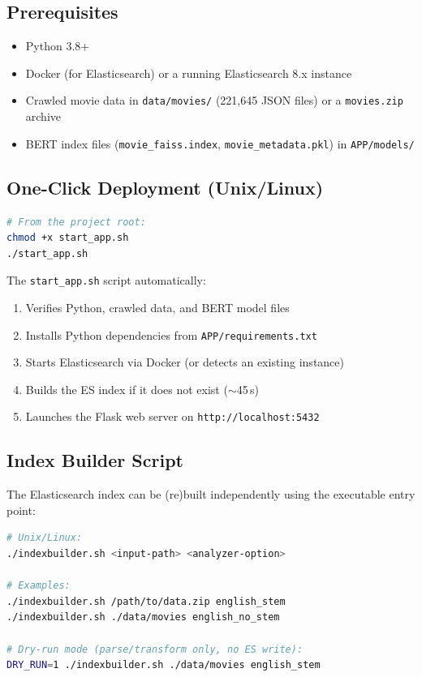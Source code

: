 \documentclass[11pt,a4paper]{article}
\begin{document}
\subsection{Prerequisites}

\begin{itemize}[nosep]
  \item Python 3.8+
  \item Docker (for Elasticsearch) or a running Elasticsearch 8.x instance
  \item Crawled movie data in \texttt{data/movies/} (221,645 JSON files) or a \texttt{movies.zip} archive
  \item BERT index files (\texttt{movie\_faiss.index}, \texttt{movie\_metadata.pkl}) in \texttt{APP/models/}
\end{itemize}

\subsection{One-Click Deployment (Unix/Linux)}

\begin{lstlisting}[language=bash]
# From the project root:
chmod +x start_app.sh
./start_app.sh
\end{lstlisting}

\noindent The \texttt{start\_app.sh} script automatically:
\begin{enumerate}[nosep]
  \item Verifies Python, crawled data, and BERT model files
  \item Installs Python dependencies from \texttt{APP/requirements.txt}
  \item Starts Elasticsearch via Docker (or detects an existing instance)
  \item Builds the ES index if it does not exist ($\sim$45\,s)
  \item Launches the Flask web server on \texttt{http://localhost:5432}
\end{enumerate}

\subsection{Index Builder Script}

The Elasticsearch index can be (re)built independently using the executable entry point:

\begin{lstlisting}[language=bash]
# Unix/Linux:
./indexbuilder.sh <input-path> <analyzer-option>

# Examples:
./indexbuilder.sh /path/to/data.zip english_stem
./indexbuilder.sh ./data/movies english_no_stem

# Dry-run mode (parse/transform only, no ES write):
DRY_RUN=1 ./indexbuilder.sh ./data/movies english_stem
\end{lstlisting}
\end{document}
